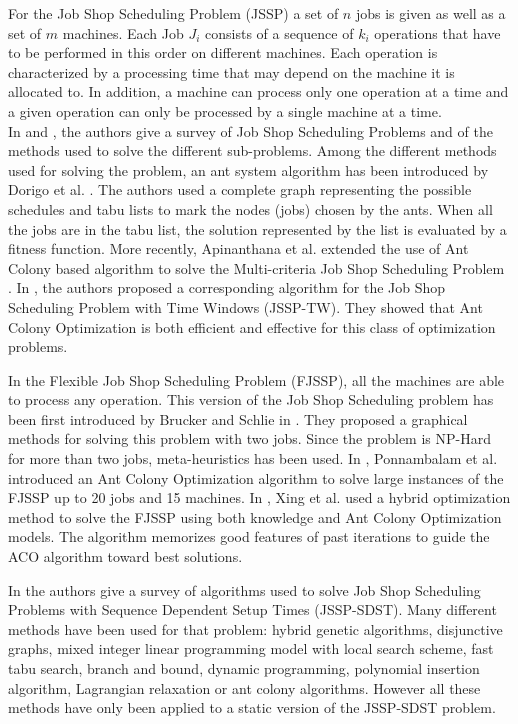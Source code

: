 \documentclass[a4paper,12pt]{article}
\begin{document}
For the Job Shop Scheduling Problem (JSSP) a set of $n$ jobs is given as well as a set of $m$ machines. Each Job $J_i$ consists of a sequence of $k_i$ operations that have to be performed in this order on different machines. Each operation is characterized by a processing time that may depend on the machine it is allocated to. In addition, a machine can process only one operation at a time and a given operation can only be processed by a single machine at a time. \\

In \cite{Jain1999} and \cite{Brucker2010}, the authors give a survey of Job Shop Scheduling Problems and of the methods used to solve the different sub-problems.
Among the different methods used for solving the problem, an ant system algorithm has been introduced by Dorigo et al. \cite{Dorigo1994}. The authors used a complete graph representing the possible schedules and tabu lists to mark the nodes (jobs) chosen by the ants. When all the jobs are in the tabu list, the solution represented by the list is evaluated by a fitness function. More recently, Apinanthana et al. extended the use of Ant Colony based algorithm to solve the Multi-criteria Job Shop Scheduling Problem \cite{Apinanthana2011}.
In \cite{Huang2008}, the authors proposed a corresponding algorithm for the Job Shop Scheduling Problem with Time Windows (JSSP-TW). They showed that Ant Colony Optimization is both efficient and effective for this class of optimization problems.

In the Flexible Job Shop Scheduling Problem (FJSSP), all the machines are able to process any operation. This version of the Job Shop Scheduling problem has been first introduced by Brucker and Schlie in \cite{Brucker1990}. They proposed a graphical methods for solving this problem with two jobs. Since the problem is NP-Hard for more than two jobs, meta-heuristics has been used. In \cite{Ponnambalam2005}, Ponnambalam et al. introduced an Ant Colony Optimization algorithm to solve large instances of the FJSSP up to 20 jobs and 15 machines. In \cite{Xing2010}, Xing et al. used a hybrid optimization method to solve the FJSSP using both knowledge and Ant Colony Optimization models. The algorithm memorizes good features of past iterations to guide the ACO algorithm toward best solutions.

In \cite{Allahverdi2008} the authors give a survey of algorithms used to solve Job Shop Scheduling Problems with Sequence Dependent Setup Times (JSSP-SDST). Many different methods have been used for that problem: hybrid genetic algorithms, disjunctive graphs, mixed integer linear programming model with local search scheme, fast tabu search, branch and bound, dynamic programming, polynomial insertion algorithm, Lagrangian relaxation or ant colony algorithms. However all these methods have only been applied to a static version of the JSSP-SDST problem.\\%
\end{document}
